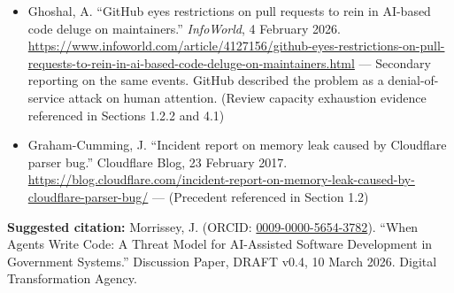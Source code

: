 \documentclass[a4paper,11pt]{report}
\begin{document}
\begin{itemize}
  --- Primary source. GitHub's Director of Open Source Programs on the
  review capacity crisis: ``The cost to create has dropped but the cost
  to review has not.'' Announces PR access controls, interaction limits,
  and automated triage. (Referenced in Sections 1.2.2 and 4.1)
\item
  Ghoshal, A. ``GitHub eyes restrictions on pull requests to rein in
  AI-based code deluge on maintainers.'' \emph{InfoWorld}, 4 February
  2026.
  \url{https://www.infoworld.com/article/4127156/github-eyes-restrictions-on-pull-requests-to-rein-in-ai-based-code-deluge-on-maintainers.html}
  --- Secondary reporting on the same events. GitHub described the
  problem as a denial-of-service attack on human attention. (Review
  capacity exhaustion evidence referenced in Sections 1.2.2 and 4.1)
\item
  Graham-Cumming, J. ``Incident report on memory leak caused by
  Cloudflare parser bug.'' Cloudflare Blog, 23 February 2017.
  \url{https://blog.cloudflare.com/incident-report-on-memory-leak-caused-by-cloudflare-parser-bug/}
  --- (Precedent referenced in Section 1.2)
\end{itemize}

\textbf{Suggested citation:} Morrissey, J. (ORCID:
\href{https://orcid.org/0009-0000-5654-3782}{0009-0000-5654-3782}).
``When Agents Write Code: A Threat Model for AI-Assisted Software
Development in Government Systems.'' Discussion Paper, DRAFT v0.4, 10
March 2026. Digital Transformation Agency.
\end{document}
